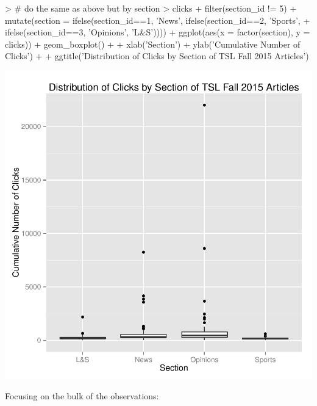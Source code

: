 \documentclass[a4paper]{article}
\begin{document}
\begin{Schunk}
\begin{Sinput}
> # do the same as above but by section
> clicks %
+   filter(section_id != 5) %
+   mutate(section = ifelse(section_id==1, 'News', ifelse(section_id==2, 'Sports',
+   ifelse(section_id==3, 'Opinions', 'L&S')))) %
+   ggplot(aes(x = factor(section), y = clicks)) + geom_boxplot() +
+   xlab('Section') + ylab('Cumulative Number of Clicks') +
+   ggtitle('Distribution of Clicks by Section of TSL Fall 2015 Articles')
\end{Sinput}
\end{Schunk}
\includegraphics{FinalProject-026}

Focusing on the bulk of the observations: 
\end{document}
